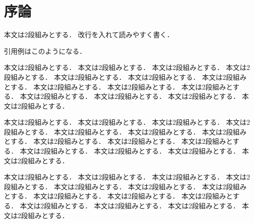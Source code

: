 \documentclass[../main]{subfiles}
\begin{document}
\graphicspath{{../figures/}}

\section{序論}
本文は2段組みとする．
改行を入れて読みやすく書く．

引用例は\cite{Schlick1994}\cite{Chikushi2020}このようになる．

本文は2段組みとする．
本文は2段組みとする．
本文は2段組みとする．
本文は2段組みとする．
本文は2段組みとする．
本文は2段組みとする．
本文は2段組みとする．
本文は2段組みとする．
本文は2段組みとする．
本文は2段組みとする．
本文は2段組みとする．
本文は2段組みとする．
本文は2段組みとする．
本文は2段組みとする．

本文は2段組みとする．
本文は2段組みとする．
本文は2段組みとする．
本文は2段組みとする．
本文は2段組みとする．
本文は2段組みとする．
本文は2段組みとする．
本文は2段組みとする．
本文は2段組みとする．
本文は2段組みとする．
本文は2段組みとする．
本文は2段組みとする．
本文は2段組みとする．
本文は2段組みとする．

本文は2段組みとする．
本文は2段組みとする．
本文は2段組みとする．
本文は2段組みとする．
本文は2段組みとする．
本文は2段組みとする．
本文は2段組みとする．
本文は2段組みとする．
本文は2段組みとする．
本文は2段組みとする．
本文は2段組みとする．
本文は2段組みとする．
本文は2段組みとする．
本文は2段組みとする．
\end{document}
